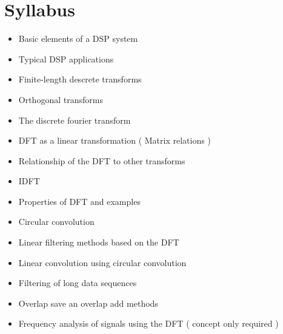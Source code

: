 \documentclass[../course]{subfiles}
\begin{document}
\section{Syllabus}

\begin{itemize}

    \item Basic elements of a DSP system
    \item Typical DSP applications
    \item Finite-length descrete transforms
    \item Orthogonal transforms
    \item The discrete fourier transform
    \item DFT as a linear transformation ( Matrix relations )
    \item Relationship of the DFT to other transforms
    \item IDFT
    \item Properties of DFT and examples
    \item Circular convolution
    \item Linear filtering methods based on the DFT
    \item Linear convolution using circular convolution
    \item Filtering of long data sequences
    \item Overlap save an overlap add methods
    \item Frequency analysis of signals using the DFT ( concept only required )

\end{itemize}
\end{document}
